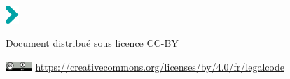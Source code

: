\vspace*{1cm}

\hspace{-1cm}
\setlength{\parindent}{0cm}
\includegraphics[width=0.5cm]{_extensions/quarto-inrae/ressources/fleche-titre}\hspace{0.3cm}\textcolor{inrae}{\sffamily\Huge\bfseries \inserttitle}\par\bigskip

\hspace{-1cm}\textcolor{inrae}{\sffamily \insertdate}\par

\vspace*{1cm}

\hspace{-1cm}\textcolor{inraefonce}{\sffamily \insertauthor}\par

\hspace{-1cm}\textcolor{inraefonce}{\sffamily
Document distribué sous licence CC-BY}\par

\hspace{-1cm}\includegraphics[width=1cm]{_extensions/quarto-inrae/ressources/cc-by} \href{https://creativecommons.org/licenses/by/4.0/fr/legalcode}{https://creativecommons.org/licenses/by/4.0/fr/legalcode}

\restoregeometry

